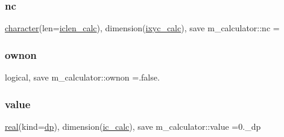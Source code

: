 \mbox{\label{namespacem__calculator_a2ba30f3ed633dcbb2d8deeb54f8a450b}} 
\subsubsection{\texorpdfstring{nc}{nc}}
{\footnotesize\ttfamily \hyperlink{option__stopwatch_83_8txt_abd4b21fbbd175834027b5224bfe97e66}{character}(len=\hyperlink{namespacem__calculator_accf705491e8bd9b3d2f0d04fd13712e7}{iclen\+\_\+calc}), dimension(\hyperlink{namespacem__calculator_a7f11fbca3121837187391693c8bf3f01}{ixyc\+\_\+calc}), save m\+\_\+calculator\+::nc =\textquotesingle{} \textquotesingle{}\hspace{0.3cm}{\ttfamily [private]}}

\mbox{\label{namespacem__calculator_a64ba59ad27c2751b72b5880500985b56}} 
\subsubsection{\texorpdfstring{ownon}{ownon}}
{\footnotesize\ttfamily logical, save m\+\_\+calculator\+::ownon =.false.\hspace{0.3cm}{\ttfamily [private]}}

\mbox{\label{namespacem__calculator_aeaff519ae0f18ac99095c955fbe12f9d}} 
\subsubsection{\texorpdfstring{value}{value}}
{\footnotesize\ttfamily \hyperlink{read__watch_83_8txt_abdb62bde002f38ef75f810d3a905a823}{real}(kind=\hyperlink{namespacem__calculator_aefb5a6c3001bb0f09ed82decb6def950}{dp}), dimension(\hyperlink{namespacem__calculator_a462e5bf8d038196149ba96c22a614284}{ic\+\_\+calc}), save m\+\_\+calculator\+::value =0.\+\_\+dp\hspace{0.3cm}{\ttfamily [private]}}

\mbox{\label{namespacem__calculator_a7d1d50fdb797826d4722b3a6d2e38442}} 
